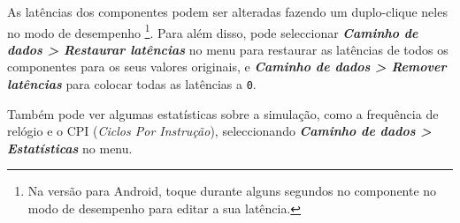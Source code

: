 \documentclass[11pt,a4paper,twoside,titlepage]{report}
\newcommand{\menupath}[1]{\textbf{\emph{#1}}}
\begin{document}
As latências dos componentes podem ser alteradas fazendo um duplo-clique
neles no modo de desempenho \footnote{Na versão para Android, toque durante
alguns segundos no componente no modo de desempenho para editar a sua
latência.}.
Para além disso, pode seleccionar 
\menupath{Caminho de dados > Restaurar latências} no menu para restaurar as
latências de todos os componentes para os seus valores originais, e
\menupath{Caminho de dados > Remover latências} para colocar todas as
latências a \verb+0+.

Também pode ver algumas estatísticas sobre a simulação, como a frequência de
relógio e o CPI (\emph{Ciclos Por Instrução}), seleccionando
\menupath{Caminho de dados > Estatísticas} no menu.
\end{document}
